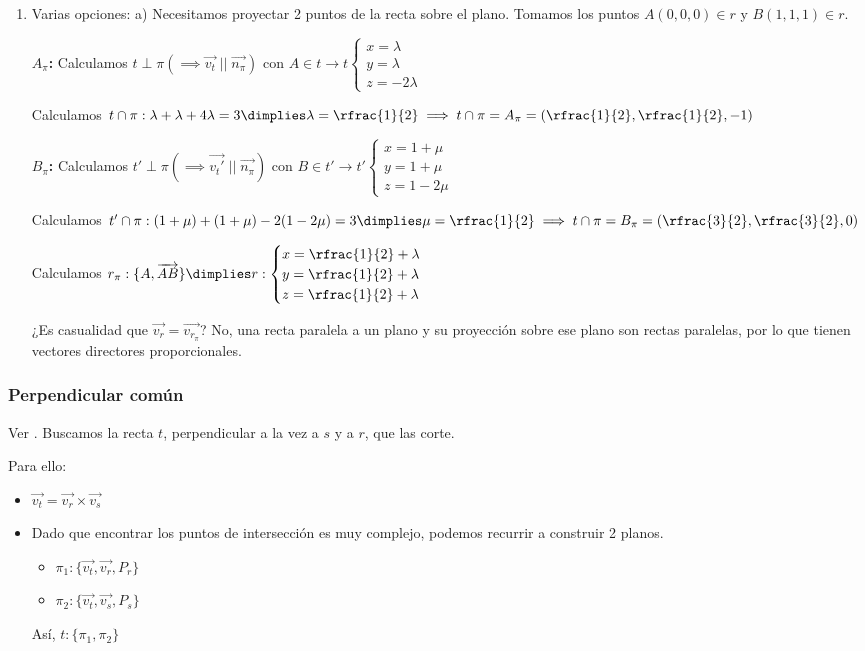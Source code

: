 \begin{problem}
\begin{enumerate}
  \item Varias opciones:
  \subitem a) Necesitamos proyectar 2 puntos de la recta sobre el plano. Tomamos los puntos $A(0,0,0)\in r$ y $B(1,1,1)\in r$.

  \textbf{$A_{\pi}$:} Calculamos $t\perp\pi (\implies \vec{v_t}\;||\;\vec{n_{\pi}})$ con $A\in t\to t\begin{cases}x=\lambda\\y=\lambda\\z=-2\lambda\end{cases}$

  Calculamos $t\cap\pi: \lambda+\lambda+4\lambda=3\dimplies \lambda=\rfrac{1}{2} \implies t\cap\pi =A_{\pi}=\left(\rfrac{1}{2},\rfrac{1}{2},-1\right)$

  \textbf{$B_{\pi}$:} Calculamos $t'\perp\pi (\implies \vec{v_t'}\;||\;\vec{n_{\pi}})$ con $B\in t'\to t'\begin{cases}x=1+\mu\\y=1+\mu\\z=1-2\mu\end{cases}$

  Calculamos $t'\cap\pi: (1+\mu)+(1+\mu)-2(1-2\mu)=3\dimplies \mu=\rfrac{1}{2} \implies t\cap\pi =B_{\pi}=\left(\rfrac{3}{2},\rfrac{3}{2},0\right)$

  Calculamos $r_{\pi}:\{A,\vec{AB}\} \dimplies r:\begin{cases}x=\rfrac{1}{2}+\lambda\\y=\rfrac{1}{2}+\lambda\\z=\rfrac{1}{2}+\lambda\end{cases}$

\obs ¿Es casualidad que $\vec{v_r} = \vec{v_{r_{\pi}}}$? No, una recta paralela a un plano y su proyección sobre ese plano son rectas paralelas, por lo que tienen vectores directores proporcionales.
\end{enumerate}

\end{problem}



\subsubsection{Perpendicular común}

Ver . Buscamos la recta $t$, perpendicular a la vez a $s$ y a $r$, que las corte. 

Para ello:
\begin{itemize}
  \item $\vec{v_t} = \vec{v_r}\times\vec{v_s}$
  \item Dado que encontrar los puntos de intersección es muy complejo, podemos recurrir a construir 2 planos.
  \begin{itemize}
    \item $\pi_1: \{\vec{v_t},\vec{v_r},P_r\}$
    \item $\pi_2: \{\vec{v_t},\vec{v_s},P_s\}$
  \end{itemize}
  Así, $t:\{\pi_1,\pi_2\}$
\end{itemize}

